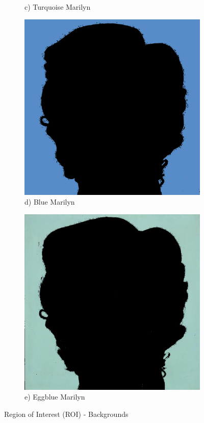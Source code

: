 \documentclass{article}
\begin{document}
\begin{figure}[htbp]
\begin{subfigure}[b]{0.19\textwidth}
        \caption*{c) Turquoise Marilyn}
    \end{subfigure}
    \hfill
    \begin{subfigure}[b]{0.19\textwidth}
        \includegraphics[width=\textwidth]{main_files/figure-latex/11_1_blue_marilyn_background_extraction.jpg}
        \caption*{d) Blue Marilyn}
    \end{subfigure}
    \hfill
    \begin{subfigure}[b]{0.19\textwidth}
        \includegraphics[width=\textwidth]{main_files/figure-latex/12_1_eggblue_marilyn_background_extraction.jpg}
        \caption*{e) Eggblue Marilyn}
    \end{subfigure}
    
    \caption{Region of Interest (ROI) - Backgrounds}
\end{figure}
\end{document}

